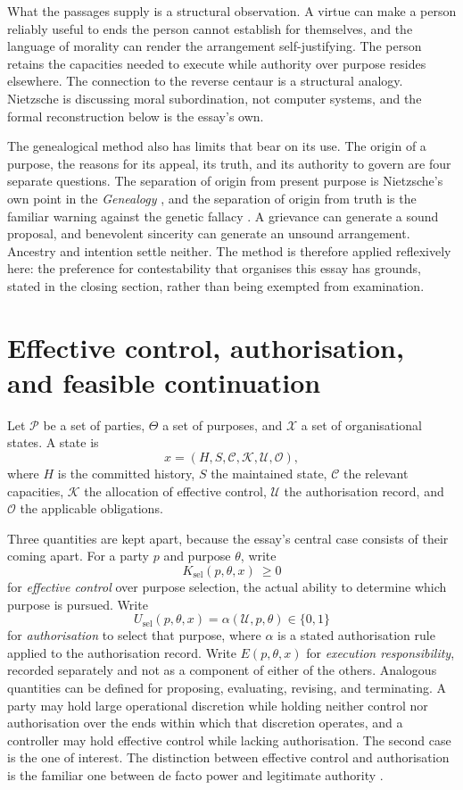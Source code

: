 \documentclass[11pt]{article}
\theoremstyle{definition}
\theoremstyle{remark}
\begin{document}
What the passages supply is a structural observation. A virtue can make a person reliably useful to ends the person cannot establish for themselves, and the language of morality can render the arrangement self-justifying. The person retains the capacities needed to execute while authority over purpose resides elsewhere. The connection to the reverse centaur is a structural analogy. Nietzsche is discussing moral subordination, not computer systems, and the formal reconstruction below is the essay's own.

The genealogical method also has limits that bear on its use. The origin of a purpose, the reasons for its appeal, its truth, and its authority to govern are four separate questions. The separation of origin from present purpose is Nietzsche's own point in the \emph{Genealogy} \cite[II, \S12]{nietzscheGM}, and the separation of origin from truth is the familiar warning against the genetic fallacy \cite{cohennagel1934}. A grievance can generate a sound proposal, and benevolent sincerity can generate an unsound arrangement. Ancestry and intention settle neither. The method is therefore applied reflexively here: the preference for contestability that organises this essay has grounds, stated in the closing section, rather than being exempted from examination.

\section{Effective control, authorisation, and feasible continuation}\label{sec:setup}

Let $\mathcal P$ be a set of parties, $\Theta$ a set of purposes, and $\mathcal X$ a set of organisational states. A state is
\[
x=(H,S,\mathcal C,\mathcal K,\mathcal U,\mathcal O),
\]
where $H$ is the committed history, $S$ the maintained state, $\mathcal C$ the relevant capacities, $\mathcal K$ the allocation of effective control, $\mathcal U$ the authorisation record, and $\mathcal O$ the applicable obligations.

Three quantities are kept apart, because the essay's central case consists of their coming apart. For a party $p$ and purpose $\theta$, write
\[
K_{\mathrm{sel}}(p,\theta,x)\ \ge 0
\]
for \emph{effective control} over purpose selection, the actual ability to determine which purpose is pursued. Write
\[
U_{\mathrm{sel}}(p,\theta,x)=\alpha(\mathcal U,p,\theta)\in\{0,1\}
\]
for \emph{authorisation} to select that purpose, where $\alpha$ is a stated authorisation rule applied to the authorisation record. Write $E(p,\theta,x)$ for \emph{execution responsibility}, recorded separately and not as a component of either of the others. Analogous quantities can be defined for proposing, evaluating, revising, and terminating. A party may hold large operational discretion while holding neither control nor authorisation over the ends within which that discretion operates, and a controller may hold effective control while lacking authorisation. The second case is the one of interest. The distinction between effective control and authorisation is the familiar one between de facto power and legitimate authority \cite{raz1986}.
\end{document}
